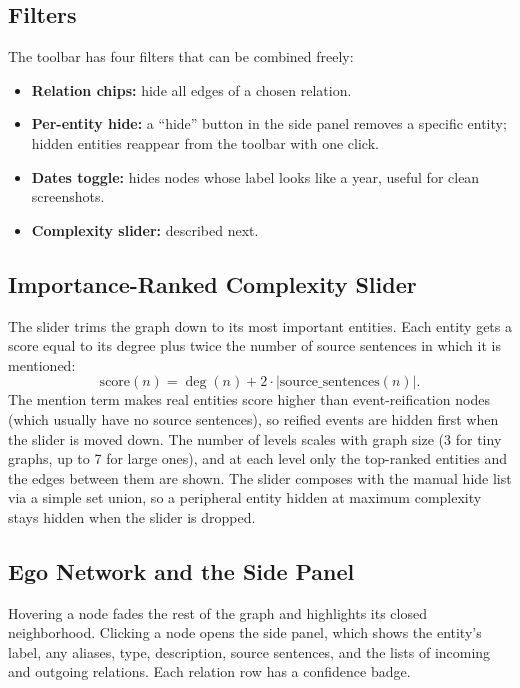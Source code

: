 \documentclass[11pt,a4paper]{article}
\begin{document}
\subsection{Filters}

The toolbar has four filters that can be combined freely:

\begin{itemize}[leftmargin=1.5em]
  \item \textbf{Relation chips:} hide all edges of a chosen relation.
  \item \textbf{Per-entity hide:} a ``hide'' button in the side panel removes a specific entity; hidden entities reappear from the toolbar with one click.
  \item \textbf{Dates toggle:} hides nodes whose label looks like a year, useful for clean screenshots.
  \item \textbf{Complexity slider:} described next.
\end{itemize}

\subsection{Importance-Ranked Complexity Slider}\label{sec:complexity}

The slider trims the graph down to its most important entities. Each entity gets a score equal to its degree plus twice the number of source sentences in which it is mentioned:
\[
\mathrm{score}(n) = \deg(n) + 2 \cdot |\mathrm{source\_sentences}(n)|.
\]
The mention term makes real entities score higher than event-reification nodes (which usually have no source sentences), so reified events are hidden first when the slider is moved down. The number of levels scales with graph size (3 for tiny graphs, up to 7 for large ones), and at each level only the top-ranked entities and the edges between them are shown. The slider composes with the manual hide list via a simple set union, so a peripheral entity hidden at maximum complexity stays hidden when the slider is dropped.

\subsection{Ego Network and the Side Panel}

Hovering a node fades the rest of the graph and highlights its closed neighborhood. Clicking a node opens the side panel, which shows the entity's label, any aliases, type, description, source sentences, and the lists of incoming and outgoing relations. Each relation row has a confidence badge.
\end{document}
